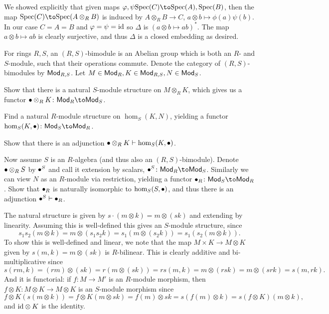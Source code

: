     \item We showed explicitly that given maps $\phi,\psi\spec(C)\to\spec(A),\spec(B)$, then the map $\spec(C)\to\spec(A\otimes_RB)$ is induced
    by $A\otimes_RB\to C$, $a\otimes b\mapsto\phi(a)\psi(b)$.
    In our case $C=A=B$ and $\varphi=\psi={\rm id}$ so $\Delta$ is $(a\otimes b\mapsto ab)^*$.
    The map $a\otimes b\mapsto ab$ is clearly surjective, and thus $\Delta$ is a closed embedding as desired.
\eenum

\bprob

    For rings $R,S$, an {\emphcolor $(R,S)$-bimodule} is an Abelian group which is both an $R$- and $S$-module, such that their operations commute.
    Denote the category of $(R,S)$-bimodules by ${\sf Mod}_{R,S}$.
    Let $M\in{\sf Mod}_R,K\in{\sf Mod}_{R,S},N\in{\sf Mod}_S$.
    \benum
        \item Show that there is a natural $S$-module structure on $M\otimes_RK$, which gives us a functor $\bul\otimes_RK\colon\Mod_R\to\Mod_S$.
        \item Find a natural $R$-module structure on $\hom_S(K,N)$, yielding a functor $\hom_S(K,\bul)\colon\Mod_S\to\Mod_R$.
        \item Show that there is an adjunction $\bullet\otimes_RK\vdash\hom_S(K,\bullet)$.
        \item Now assume $S$ is an $R$-algebra (and thus also an $(R,S)$-bimodule).
        Denote $\bullet\otimes_RS$ by $\bullet^S$ and call it {\emphcolor extension by scalars}, $\bul^S\colon\Mod_R\to\Mod_S$.
        Similarly we can view $N$ as an $R$-module via {\emphcolor restriction}, yielding a functor $\bul_R\colon\Mod_S\to\Mod_R$.
        Show that $\bullet_R$ is naturally isomorphic to $\hom_S(S,\bullet)$, and thus there is an adjunction $\bullet^S\vdash\bullet_R$.
    \eenum

\eprob

\benum
    \item The natural structure is given by $s\cdot(m\otimes k)=m\otimes(sk)$ and extending by linearity.
    Assuming this is well-defined this gives an $S$-module structure, since
    $$ s_1s_2(m\otimes k)=m\otimes(s_1s_2k)=s_1(m\otimes(s_2k))=s_1(s_2(m\otimes k)) . $$
    To show this is well-defined and linear, we note that the map $M\times K\to M\otimes K$ given by $s(m,k)=m\otimes(sk)$ is $R$-bilinear.
    This is clearly additive and bi-multiplicative since
    $$ s(rm,k) = (rm)\otimes(sk) = r(m\otimes(sk)) = rs(m,k) = m\otimes(rsk) = m\otimes(srk) = s(m,rk) . $$
    And it is functorial: if $f\colon M\to M'$ is an $R$-module morphism, then $f\otimes K\colon M\otimes K\to M\otimes K$ is an $S$-module morphism since 
    $$ f\otimes K(s(m\otimes k)) = f\otimes K(m\otimes sk) = f(m)\otimes sk = s(f(m)\otimes k) = s(f\otimes K)(m\otimes k) , $$
    and ${\rm id}\otimes K$ is the identity.


